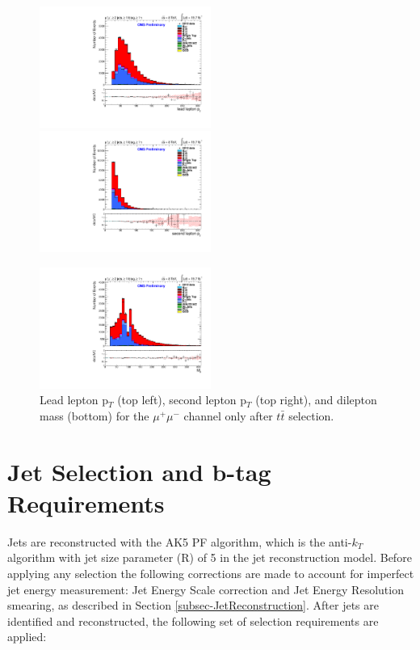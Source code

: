 \begin{figure}
\includegraphics[width=0.5\textwidth]{Plots/ControlPlots/TTbarDiLeptonAnalysis/MuMu/DiLepton/LeadLepton_Pt_splitTTbar_ratio.pdf}
\includegraphics[width=0.5\textwidth]{Plots/ControlPlots/TTbarDiLeptonAnalysis/MuMu/DiLepton/SecondLepton_Pt_splitTTbar_ratio.pdf}\\
\begin{center}
\includegraphics[width=0.5\textwidth]{Plots/ControlPlots/TTbarDiLeptonAnalysis/MuMu/DiLepton/diLepton_Mass_splitTTbar_ratio.pdf}
\end{center}
\caption{Lead lepton p$_T$ (top left), second lepton p$_T$ (top right), and dilepton mass (bottom) for the $\mu^{+}\mu^{-}$ channel only after $t\bar{t}$ selection.}
\label{fig-leptonPlots}
\end{figure}

\section{Jet Selection and b-tag Requirements} \label{sec-JetSelection}

Jets are reconstructed with the AK5 PF algorithm, which is the anti-$k_T$ algorithm with jet size parameter (R) of 5 in the jet reconstruction model. Before applying any selection the following corrections are made to account for imperfect jet energy measurement: Jet Energy Scale correction and Jet Energy Resolution smearing, as described in Section \ref{subsec-JetReconstruction}. After jets are identified and reconstructed, the following set of selection requirements are applied:

